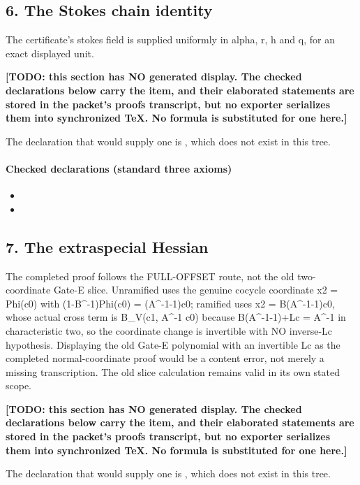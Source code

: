 \subsection*{6. The Stokes chain identity}
The certificate's stokes field is supplied uniformly in alpha, r, h and q, for an exact displayed unit.

\par\noindent\textbf{[TODO: this section has NO generated display. The checked declarations below carry the item, and their elaborated statements are stored in the packet's proofs transcript, but no exporter serializes them into synchronized TeX. No formula is substituted for one here.]}
\par\noindent The declaration that would supply one is , which does not exist in this tree.
\paragraph{Checked declarations (standard three axioms)}
\begin{itemize}
\item {}
\item {}
\end{itemize}

\subsection*{7. The extraspecial Hessian}
The completed proof follows the FULL-OFFSET route, not the old two-coordinate Gate-E slice. Unramified uses the genuine cocycle coordinate x2 = Phi(c0) with (1-B\textasciicircum{}-1)Phi(c0) = (A\textasciicircum{}-1-1)c0; ramified uses x2 = B(A\textasciicircum{}-1-1)c0, whose actual cross term is B\_V(c1, A\textasciicircum{}-1 c0) because B(A\textasciicircum{}-1-1)+Lc = A\textasciicircum{}-1 in characteristic two, so the coordinate change is invertible with NO inverse-Lc hypothesis. Displaying the old Gate-E polynomial with an invertible Lc as the completed normal-coordinate proof would be a content error, not merely a missing transcription. The old slice calculation remains valid in its own stated scope.

\par\noindent\textbf{[TODO: this section has NO generated display. The checked declarations below carry the item, and their elaborated statements are stored in the packet's proofs transcript, but no exporter serializes them into synchronized TeX. No formula is substituted for one here.]}
\par\noindent The declaration that would supply one is , which does not exist in this tree.
